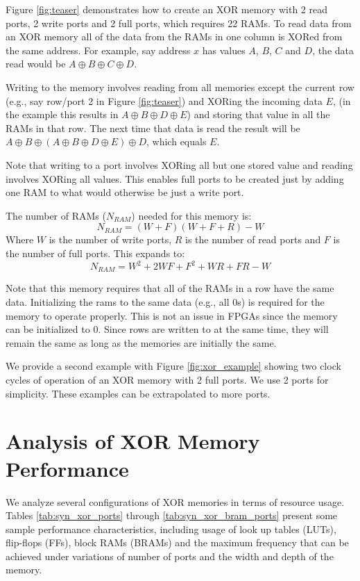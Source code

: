 \documentclass[sigconf,nonacm]{acmart}
\begin{document}
Figure \ref{fig:teaser} demonstrates how to create an XOR memory with 2 read ports, 2 write ports and 2 full ports, which requires 22 RAMs. To read data from an XOR memory all of the data from the RAMs in one column is XORed from the same address. For example, say address $x$ has values $A$, $B$, $C$ and $D$, the data read would be $A\oplus B\oplus C \oplus D$.

Writing to the memory involves reading from all memories except the current row (e.g., say row/port 2 in Figure \ref{fig:teaser}) and XORing the incoming data $E$, (in the example this results in $A\oplus B \oplus D \oplus E$) and storing that value in all the RAMs in that row.
The next time that data is read the result will be $A\oplus B \oplus (A \oplus B\oplus D\oplus E) \oplus D$, which equals $E$.

Note that writing to a port involves XORing all but one stored value and reading involves XORing all values. This enables full ports to be created just by adding one RAM to what would otherwise be just a write port.

The number of RAMs ($N_{RAM}$) needed for this memory is:
\begin{equation}
N_{RAM}=(W+F)(W+F+R)-W
\end{equation}
Where $W$ is the number of write ports, $R$ is the number of read ports and $F$ is the number of full ports. This expands to:
\begin{equation}
N_{RAM}=W^2 + 2WF + F^2 + WR + FR - W
\end{equation}

Note that this memory requires that all of the RAMs in a row have the same data. Initializing the rams to the same data (e.g., all 0s) is required for the memory to operate properly. This is not an issue in FPGAs since the memory can be initialized to 0. Since rows are written to at the same time, they will remain the same as long as the memories are initially the same.

We provide a second example with Figure \ref{fig:xor_example} showing two clock cycles of operation of an XOR memory with 2 full ports. We use 2 ports for simplicity. These examples can be extrapolated to more ports.

\section{Analysis of XOR Memory Performance}

We analyze several configurations of XOR memories in terms of resource usage. Tables \ref{tab:syn_xor_ports} through \ref{tab:syn_xor_bram_ports} present some sample performance characteristics, including usage of look up tables (LUTs), flip-flops (FFs), block RAMs (BRAMs) and the maximum frequency that can be achieved under variations of number of ports and the width and depth of the memory.
\end{document}
